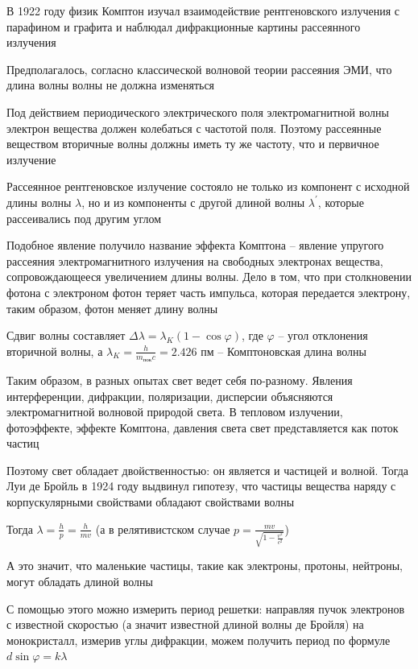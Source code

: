 \documentclass[12pt]{article}
\begin{document}
В 1922 году физик Комптон изучал взаимодействие рентгеновского излучения с парафином и графита и наблюдал дифракционные картины рассеянного излучения

Предполагалось, согласно классической волновой теории рассеяния ЭМИ, что длина волны волны не должна изменяться

Под действием периодического электрического поля электромагнитной волны электрон вещества должен колебаться с частотой поля. Поэтому рассеянные веществом вторичные волны должны иметь ту же частоту, что и первичное излучение


Рассеянное рентгеновское излучение состояло не только из компонент с исходной длины волны $\lambda$, но и из компоненты с другой длиной волны $\lambda^\prime$, которые рассеивались под другим углом

Подобное явление получило название эффекта Комптона -- явление упругого рассеяния электромагнитного излучения на свободных электронах вещества, сопровождающееся увеличением длины волны. Дело в том, что при столкновении фотона с электроном фотон теряет часть импульса, которая передается электрону, таким образом, фотон меняет длину волны

Сдвиг волны составляет $\Delta \lambda = \lambda_K (1 - \cos\varphi)$, где $\varphi$ -- угол отклонения вторичной волны, а $\lambda_K = \frac{h}{m_{\text{пок}} c} = 2.426$ пм -- Комптоновская длина волны

\mediumvspace

Таким образом, в разных опытах свет ведет себя по-разному. Явления интерференции, дифракции, поляризации, дисперсии объясняются электромагнитной волновой природой света. В тепловом излучении, фотоэффекте, эффекте Комптона, давления света свет представляется как поток частиц

Поэтому свет обладает двойственностью: он является и частицей и волной. Тогда Луи де Бройль в 1924 году выдвинул гипотезу, что частицы вещества наряду с корпускулярными свойствами обладают свойствами волны

Тогда $\lambda = \frac{h}{p} = \frac{h}{mv}$ (а в релятивистском случае $p = \frac{mv}{\sqrt{1 - \frac{v^2}{c^2}}}$)

А это значит, что маленькие частицы, такие как электроны, протоны, нейтроны, могут обладать длиной волны

С помощью этого можно измерить период решетки: направляя пучок электронов с известной скоростью (а значит известной длиной волны де Бройля) на монокристалл, измерив углы дифракции, можем получить период по формуле $d \sin \varphi = k \lambda$
\end{document}
